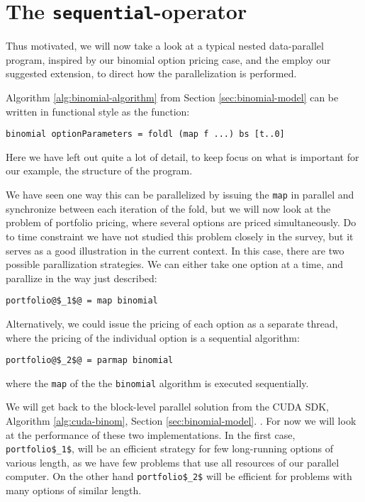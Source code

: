 \section{The \texttt{sequential}-operator}

Thus motivated, we will now take a look at a typical nested
data-parallel program, inspired by our binomial option pricing case,
and the employ our suggested extension, to direct how the
parallelization is performed.

Algorithm \ref{alg:binomial-algorithm} from Section
\ref{sec:binomial-model} can be written in functional style as the
function:
\begin{lstlisting}
binomial optionParameters = foldl (map f ...) bs [t..0]
\end{lstlisting}
Here we have left out quite a lot of detail, to keep focus on what is
important for our example, the structure of the program.

We have seen one way this can be parallelized by issuing the
\lstinline{map} in parallel and synchronize between each
iteration of the fold, but we will now look at the problem of
portfolio pricing, where several options are priced simultaneously. Do
to time constraint we have not studied this problem closely in the
survey, but it serves as a good illustration in the current
context. In this case, there are two possible parallization
strategies. We can either take one option at a time, and parallize in
the way just described:
\begin{lstlisting}
portfolio@$_1$@ = map binomial
\end{lstlisting}
Alternatively, we could issue the pricing of each option as a separate
thread, where the pricing of the individual option is a sequential algorithm:
\begin{lstlisting}
portfolio@$_2$@ = parmap binomial
\end{lstlisting}
where the \lstinline{map} of the the \lstinline{binomial} algorithm is
executed sequentially.

We will get back to the block-level parallel solution from the CUDA
SDK, Algorithm \ref{alg:cuda-binom}, Section
\ref{sec:binomial-model}. . For now we will look at the performance of these two
implementations. In the first case, \lstinline[mathescape]{portfolio$_1$}, will
be an efficient strategy for few long-running options of various
length, as we have few problems that use all resources of our parallel
computer. On the other hand \lstinline[mathescape]{portfolio$_2$} will be
efficient for problems with many options of similar
length. 

